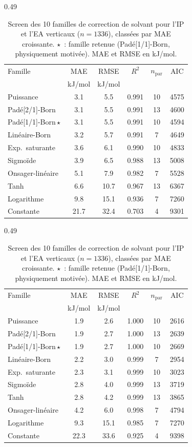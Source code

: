 \begin{table}[htbp]
\centering\footnotesize
\setlength{\tabcolsep}{3.5pt}
\begin{subtable}[t]{0.49\textwidth}
\centering
\caption{IP vertical (oxydation)}\label{tab:ms_ip_families}
\begin{tabular}{lccccc}
\toprule
Famille & MAE & RMSE & $R^2$ & $n_{\mathrm{par}}$ & AIC \\
 & {\tiny kJ/mol} & {\tiny kJ/mol} & & & \\
\midrule
Puissance & 3.1 & 5.5 & 0.991 & 10 & 4575 \\
Padé[2/1]-Born & 3.1 & 5.5 & 0.991 & 13 & 4600 \\
Padé[1/1]-Born\,$\star$ & 3.1 & 5.5 & 0.991 & 10 & 4594 \\
Linéaire-Born & 3.2 & 5.7 & 0.991 & 7 & 4649 \\
Exp.\ saturante & 3.6 & 6.1 & 0.990 & 10 & 4833 \\
Sigmoïde & 3.9 & 6.5 & 0.988 & 13 & 5008 \\
Onsager-linéaire & 5.1 & 7.9 & 0.982 & 7 & 5528 \\
Tanh & 6.6 & 10.7 & 0.967 & 13 & 6367 \\
Logarithme & 9.8 & 15.1 & 0.936 & 7 & 7260 \\
Constante & 21.7 & 32.4 & 0.703 & 4 & 9301 \\
\bottomrule
\end{tabular}
\end{subtable}
\hfill
\begin{subtable}[t]{0.49\textwidth}
\centering
\caption{EA verticale (réduction)}\label{tab:ms_ea_families}
\begin{tabular}{lccccc}
\toprule
Famille & MAE & RMSE & $R^2$ & $n_{\mathrm{par}}$ & AIC \\
 & {\tiny kJ/mol} & {\tiny kJ/mol} & & & \\
\midrule
Puissance & 1.9 & 2.6 & 1.000 & 10 & 2616 \\
Padé[2/1]-Born & 1.9 & 2.7 & 1.000 & 13 & 2639 \\
Padé[1/1]-Born\,$\star$ & 1.9 & 2.7 & 1.000 & 10 & 2669 \\
Linéaire-Born & 2.2 & 3.0 & 0.999 & 7 & 2954 \\
Exp.\ saturante & 2.3 & 3.1 & 0.999 & 10 & 3023 \\
Sigmoïde & 2.8 & 4.0 & 0.999 & 13 & 3719 \\
Tanh & 2.8 & 4.2 & 0.999 & 13 & 3865 \\
Onsager-linéaire & 4.2 & 6.0 & 0.998 & 7 & 4794 \\
Logarithme & 9.3 & 15.1 & 0.985 & 7 & 7270 \\
Constante & 22.3 & 33.6 & 0.925 & 4 & 9398 \\
\bottomrule
\end{tabular}
\end{subtable}
\caption{Screen des 10 familles de correction de solvant pour l'IP et l'EA verticaux ($n = 1336$), classées par MAE croissante. $\star$~: famille retenue (Padé[1/1]-Born, physiquement motivée). MAE et RMSE en kJ/mol.}
\label{tab:ms_families}
\end{table}